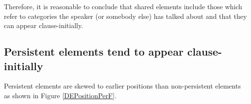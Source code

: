 Therefore, it is reasonable to conclude that
shared elements include those which refer to categories the speaker (or somebody else) has talked about and that
they can appear clause-initially.


\subsection{Persistent elements tend to appear clause-initially}\label{PersistentAppearClause-Initially}

Persistent elements are skewed to earlier positions than non-persistent elements
as shown in Figure \ref{DEPositionPerF}.

